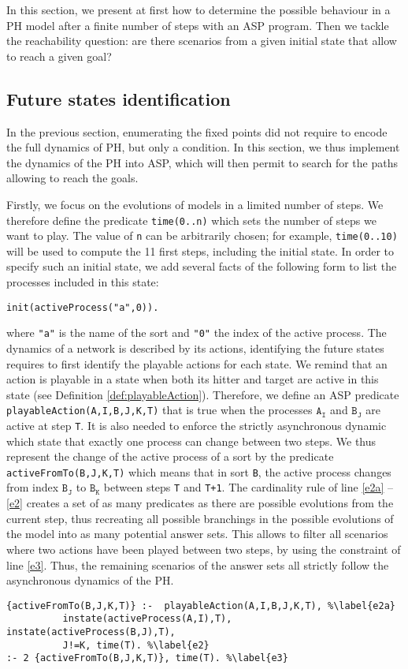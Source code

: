 
In this section, we present at first how to determine the possible behaviour in a PH model after a finite number of steps with an ASP program.
Then we tackle the reachability question: are there scenarios from a given initial state
that allow to reach a given goal?

\subsection{Future states identification}
In the previous section, enumerating the fixed points did not require to
encode the full dynamics of PH, but only a condition.
In this section, we thus implement the dynamics of the PH into ASP,
which will then permit to search for the paths allowing to reach the goals.

Firstly, we focus on the evolutions of models in a limited number of steps.
We therefore define the predicate \texttt{time(0..n)} which sets the number of steps we want to play.
The value of \texttt{n} can be arbitrarily chosen;
for example, \texttt{time(0..10)} will be used to compute the 11 first steps,
including the initial state.
In order to specify such an initial state, we add several facts of the following form
to list the processes included in this state:
\begin{lstlisting}
init(activeProcess("a",0)).
\end{lstlisting}
where \texttt{"a"} is the name of the sort and \texttt{"0"} the index of the active process.
The dynamics of a network is described by its actions,
identifying the future states requires to first identify the playable actions for each state.
We remind that an action is playable in a state when both its hitter and target are active in this state (see Definition \ref{def:playableAction}).
Therefore, we define an ASP predicate \texttt{playableAction(A,I,B,J,K,T)} that is true
when the processes $\texttt{A}_\texttt{I}$ and $\texttt{B}_\texttt{J}$ are active at step \texttt{T}.
It is also needed to enforce the strictly asynchronous dynamic
which state that exactly one process can change between two steps.
We thus represent the change of the active process of a sort
by the predicate \texttt{activeFromTo(B,J,K,T)}
which means that in sort \texttt{B}, the active process changes from index $\texttt{B}_\texttt{J}$ to $\texttt{B}_\texttt{K}$ between steps \texttt{T} and \texttt{T+1}.
The cardinality rule of line \ref{e2a} -- \ref{e2}
creates a set of as many predicates as there are possible evolutions from the current step,
thus recreating all possible branchings in the possible evolutions of the model into as many potential answer sets.
This allows to filter all scenarios where two actions have been played between
two steps, by using the constraint of line \ref{e3}.
Thus, the remaining scenarios of the answer sets all strictly follow
the asynchronous dynamics of the PH.
\begin{lstlisting}
{activeFromTo(B,J,K,T)} :-  playableAction(A,I,B,J,K,T), %\label{e2a}
          instate(activeProcess(A,I),T), instate(activeProcess(B,J),T),
          J!=K, time(T). %\label{e2}
:- 2 {activeFromTo(B,J,K,T)}, time(T). %\label{e3}
\end{lstlisting}

